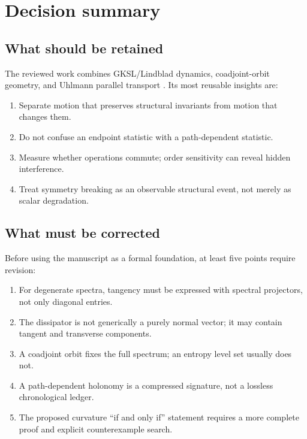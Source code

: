 \section{Decision summary}

\subsection{What should be retained}

The reviewed work combines GKSL/Lindblad dynamics, coadjoint-orbit geometry, and Uhlmann parallel transport \citep{lindblad1976,gorini1976,uhlmann1986,uhlmann1991,souriau1969}. Its most reusable insights are:

\begin{enumerate}[label=\arabic*.]
  \item Separate motion that preserves structural invariants from motion that changes them.
  \item Do not confuse an endpoint statistic with a path-dependent statistic.
  \item Measure whether operations commute; order sensitivity can reveal hidden interference.
  \item Treat symmetry breaking as an observable structural event, not merely as scalar degradation.
\end{enumerate}

\subsection{What must be corrected}

Before using the manuscript as a formal foundation, at least five points require revision:

\begin{enumerate}[label=\arabic*.]
  \item For degenerate spectra, tangency must be expressed with spectral projectors, not only diagonal entries.
  \item The dissipator is not generically a purely normal vector; it may contain tangent and transverse components.
  \item A coadjoint orbit fixes the full spectrum; an entropy level set usually does not.
  \item A path-dependent holonomy is a compressed signature, not a lossless chronological ledger.
  \item The proposed curvature ``if and only if'' statement requires a more complete proof and explicit counterexample search.
\end{enumerate}

